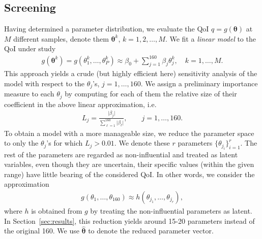 \subsection{Screening}
\label{sec:screen}
Having determined a parameter distribution, we evaluate the QoI $q=g(\boldsymbol{\theta})$ at $M$ different samples, denote them $\boldsymbol{\theta}^k$, $k=1,2,\dots,M$.
We fit a {\sl linear model} to the QoI under study
\begin{eqnarray}
g(\boldsymbol\theta^k) = g(\theta_1^k, \dots, \theta_P^k) \approx \beta_0 + \sum\limits_{j=1}^{160} \beta_j \theta_j^k, \quad k=1, \dots, M. \label{lr}
\end{eqnarray}
This approach yields a crude (but highly efficient here) sensitivity analysis of the model with respect to the $\theta_j$'s, $j=1,\dots, 160$. We assign a preliminary importance measure to each $\theta_j$ by computing for each of them the relative size of their coefficient in the above linear approximation, i.e.
\begin{eqnarray*}
L_j = \frac{\vert \beta_j \vert}{\sum\limits_{\ell=1}^{160} \vert \beta_\ell \vert}, \qquad j=1,\dots,160.
\end{eqnarray*}
To obtain a model with a more manageable size, we reduce the parameter space to only the $\theta_j$'s for which $L_j>0.01$. We denote these $r$ parameters $\{ \theta_{j_i}\}_{i=1}^r$. The rest of the parameters are regarded as non-influential and treated as latent variables, even though they are uncertain, their specific values (within the given range) have little bearing of the considered QoI. In other words, we consider the approximation 
\begin{eqnarray}
g(\theta_1, \dots, \theta_{160}) \approx h(\theta_{j_1}, \dots, \theta_{j_r}), \label{reddim}
\end{eqnarray}
where $h$ is obtained from $g$ by treating the non-influential parameters as latent. In Section~\ref{sec:results}, this reduction yields around 15-20 parameters instead of the original 160. We use $\hat{\boldsymbol{\theta}}$ to denote the reduced parameter vector.


